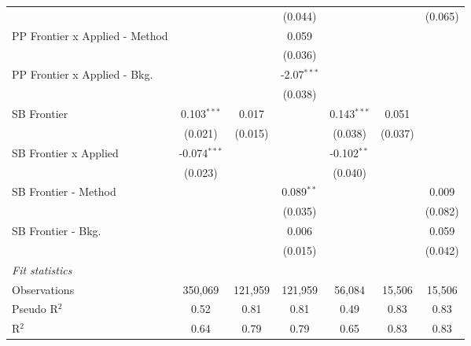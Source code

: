 \begin{tabular}{lcccccc}
                                  &                &                & (0.044)        &                &                & (0.065)\\   
   PP Frontier x Applied - Method &                &                & 0.059          &                &                &   \\   
                                  &                &                & (0.036)        &                &                &   \\   
   PP Frontier x Applied - Bkg.   &                &                & -2.07$^{***}$  &                &                &   \\   
                                  &                &                & (0.038)        &                &                &   \\   
   SB Frontier                    & 0.103$^{***}$  & 0.017          &                & 0.143$^{***}$  & 0.051          &   \\   
                                  & (0.021)        & (0.015)        &                & (0.038)        & (0.037)        &   \\   
   SB Frontier x Applied          & -0.074$^{***}$ &                &                & -0.102$^{**}$  &                &   \\   
                                  & (0.023)        &                &                & (0.040)        &                &   \\   
   SB Frontier - Method           &                &                & 0.089$^{**}$   &                &                & 0.009\\   
                                  &                &                & (0.035)        &                &                & (0.082)\\   
   SB Frontier - Bkg.             &                &                & 0.006          &                &                & 0.059\\   
                                  &                &                & (0.015)        &                &                & (0.042)\\   
   \midrule
   \emph{Fit statistics}\\
   Observations                   & 350,069        & 121,959        & 121,959        & 56,084         & 15,506         & 15,506\\  
   Pseudo R$^2$                   & 0.52           & 0.81           & 0.81           & 0.49           & 0.83           & 0.83\\  
   R$^2$                          & 0.64           & 0.79           & 0.79           & 0.65           & 0.83           & 0.83\\  
   

\end{tabular}
